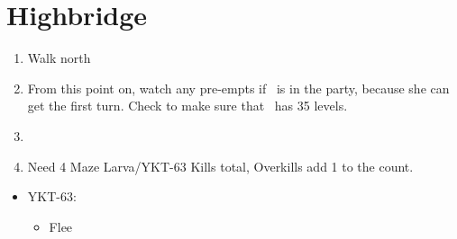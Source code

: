 \chapter{Highbridge}
\begin{spheregrid}
	\begin{itemize}
		\yunaf
	\end{itemize}
\end{spheregrid}
\begin{enumerate}
	\item Walk north
	\item From this point on, watch any pre-empts if \yuna\ is in the party, because she can get the first turn. Check to make sure that \lulu\ has 35 levels.
	\item \formation{\tidus}{\yuna}{\auron}
	\item Need 4 Maze Larva/YKT-63 Kills total, Overkills add 1 to the count.
\end{enumerate}
\bothvfill
\begin{encounters}
	\begin{itemize}
		\item YKT-63:
		      \begin{itemize}
			      \tidusf Attack
			      \yunaf Attack
			      \item Flee
		      \end{itemize}
	\end{itemize}
\end{encounters}
